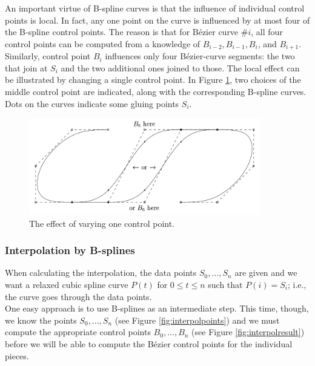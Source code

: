\documentclass[]{usiinfbachelorproject}
\begin{document}
An important virtue of B-spline curves is that the influence of individual control points is local. In fact, any one point on the curve is influenced by at most four of the B-spline control points. The reason is that for B\'ezier curve $\#i$, all four control points can be computed from a knowledge of $B_{i-2}, B_{i-1}, B_i$, and $B_{i+1}$. Similarly, control point $B_i$ influences only four B\'ezier-curve segments: the two that join at $S_i$ and the two additional ones joined to those. The local effect can be illustrated by changing a single control point. In Figure \ref{fig:locality}, two choices of the middle control point are indicated, along with the corresponding B-spline curves. Dots on the curves indicate some gluing points $S_i$.

\begin{figure}[ht]
	\centering
	\includegraphics[width=0.9\textwidth]{img/spline_locality.png}
	\caption{The effect of varying one control point.}
	\label{fig:locality}
\end{figure}

\subsubsection{Interpolation by B-splines} \label{sec:interpol}

When calculating the interpolation, the data points $S_0,...,S_n$ are given and we want a relaxed cubic spline curve $P(t)$ for $0 \le t \le n$ such that $P(i) = S_i$; i.e., the curve goes through the data points.\\
One easy approach is to use B-splines as an intermediate step. This time, though, we know the points $S_0,..., S_n$ (see Figure \ref{fig:interpolpoints}) and we must compute the appropriate control points $B_0, ..., B_n$ (see Figure \ref{fig:interpolresult}) before we will be able to compute the B\'ezier control points for the individual pieces.\\
\end{document}

